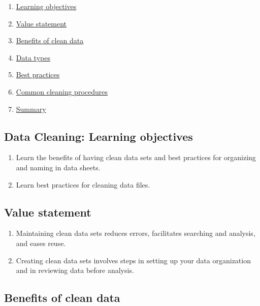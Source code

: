 \documentclass[
]{book}
\providecommand{\tightlist}{%
  \setlength{\itemsep}{0pt}\setlength{\parskip}{0pt}}
\begin{document}
\begin{enumerate}
\def\labelenumi{\arabic{enumi}.}
\tightlist
\item
  \protect\hyperlink{data-cleaning-learning-objectives}{Learning objectives}
\item
  \protect\hyperlink{data-cleaning-value-statement}{Value statement}
\item
  \protect\hyperlink{benefits-of-clean-data}{Benefits of clean data}
\item
  \protect\hyperlink{data-types}{Data types}
\item
  \protect\hyperlink{best-practices}{Best practices}
\item
  \protect\hyperlink{common-cleaning-procedures}{Common cleaning procedures}
\item
  \protect\hyperlink{summary}{Summary}
\end{enumerate}

\hypertarget{data-cleaning-learning-objectives}{%
\subsection{Data Cleaning: Learning objectives}\label{data-cleaning-learning-objectives}}

\begin{enumerate}
\def\labelenumi{\arabic{enumi}.}
\item
  Learn the benefits of having clean data sets and best practices for organizing and naming in data sheets.
\item
  Learn best practices for cleaning data files.
\end{enumerate}

\hypertarget{value-statement}{%
\subsection{Value statement}\label{value-statement}}

\begin{enumerate}
\def\labelenumi{\arabic{enumi}.}
\item
  Maintaining clean data sets reduces errors, facilitates searching and analysis, and eases reuse.
\item
  Creating clean data sets involves steps in setting up your data organization and in reviewing data before analysis.
\end{enumerate}

\hypertarget{benefits-of-clean-data}{%
\subsection{Benefits of clean data}\label{benefits-of-clean-data}}
\end{document}
